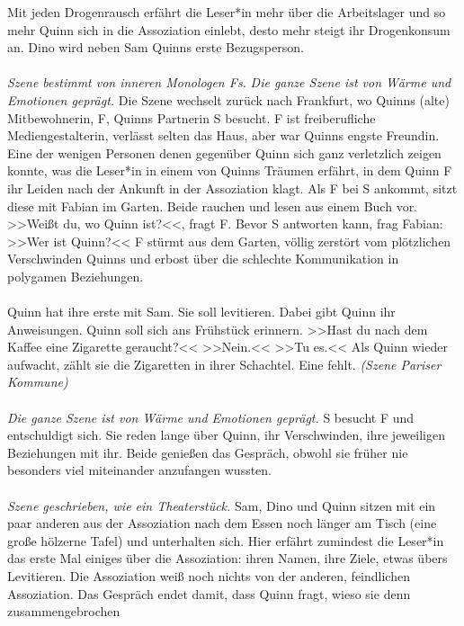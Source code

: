 Mit jeden Drogenrausch erfährt die Leser*in mehr über die Arbeitslager und so
mehr Quinn sich in die Assoziation einlebt, desto mehr steigt ihr Drogenkonsum
an. 
Dino wird neben Sam Quinns erste Bezugsperson.\\\\ 
% 
\emph{Szene bestimmt von inneren Monologen Fs.}
\emph{Die ganze Szene ist von Wärme und Emotionen geprägt.}
Die Szene wechselt zurück nach Frankfurt, wo Quinns (alte) Mitbewohnerin, F,
Quinns Partnerin S besucht. 
F ist freiberufliche Mediengestalterin, verlässt selten das Haus, aber war
Quinns engste Freundin.
Eine der wenigen Personen denen gegenüber Quinn sich ganz verletzlich zeigen
konnte, was die Leser*in in einem von Quinns Träumen erfährt, in dem Quinn F 
ihr Leiden nach der Ankunft in der Assoziation klagt. 
Als F bei S ankommt, sitzt diese mit Fabian im Garten. 
Beide rauchen und lesen aus einem Buch vor.
>>Weißt du, wo Quinn ist?<<, fragt F. 
Bevor S antworten kann, frag Fabian: >>Wer ist Quinn?<< 
F stürmt aus dem Garten, völlig zerstört vom plötzlichen
Verschwinden Quinns und erbost über die schlechte Kommunikation in polygamen
Beziehungen.\\\\
% 
Quinn hat ihre erste  mit Sam.
Sie soll levitieren. 
Dabei gibt Quinn ihr Anweisungen. 
Quinn soll sich ans Frühstück erinnern. 
>>Hast du nach dem Kaffee eine Zigarette geraucht?<< 
>>Nein.<< 
>>Tu es.<< 
Als Quinn wieder aufwacht, zählt sie die Zigaretten in ihrer Schachtel. 
Eine fehlt. \emph{(Szene Pariser Kommune)}\\\\
% 
\emph{Die ganze Szene ist von Wärme und Emotionen geprägt.}
S besucht F und entschuldigt sich.
Sie reden lange über Quinn, ihr Verschwinden, ihre jeweiligen Beziehungen mit
ihr. 
Beide genießen das Gespräch, obwohl sie früher nie besonders viel miteinander
anzufangen wussten.\\\\
%
\emph{Szene geschrieben, wie ein Theaterstück.}
Sam, Dino und Quinn sitzen mit ein paar anderen aus der Assoziation nach dem
Essen noch länger am Tisch (eine große hölzerne Tafel) und unterhalten sich. 
Hier erfährt zumindest die Leser*in das erste Mal einiges über die Assoziation: 
ihren Namen, ihre Ziele, etwas übers Levitieren. 
Die Assoziation weiß noch nichts von der anderen, feindlichen Assoziation. 
Das Gespräch endet damit, dass Quinn fragt, wieso sie denn zusammengebrochen
